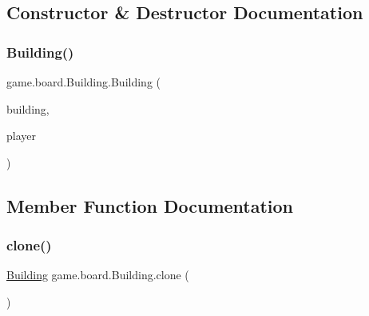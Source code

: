 \subsection{Constructor \& Destructor Documentation}
\mbox{\label{classgame_1_1board_1_1_building_a6b8b4d376b57c78e14e8f6f61a046954}} 
\subsubsection{\texorpdfstring{Building()}{Building()}}
{\footnotesize\ttfamily game.\+board.\+Building.\+Building (\begin{DoxyParamCaption}\item[{\mbox{\hyperlink{enumrule_engine_1_1entity_1_1_e_building_property}{E\+Building\+Property}}}]{building,  }\item[{\mbox{\hyperlink{enumgame_1_1_e_player}{E\+Player}}}]{player }\end{DoxyParamCaption})\hspace{0.3cm}{\ttfamily [inline]}}



\subsection{Member Function Documentation}
\mbox{\label{classgame_1_1board_1_1_building_a16638e9e0998a6e18c5beba410cfdf66}} 
\subsubsection{\texorpdfstring{clone()}{clone()}}
{\footnotesize\ttfamily \mbox{\hyperlink{classgame_1_1board_1_1_building}{Building}} game.\+board.\+Building.\+clone (\begin{DoxyParamCaption}{ }\end{DoxyParamCaption})\hspace{0.3cm}{\ttfamily [inline]}}

